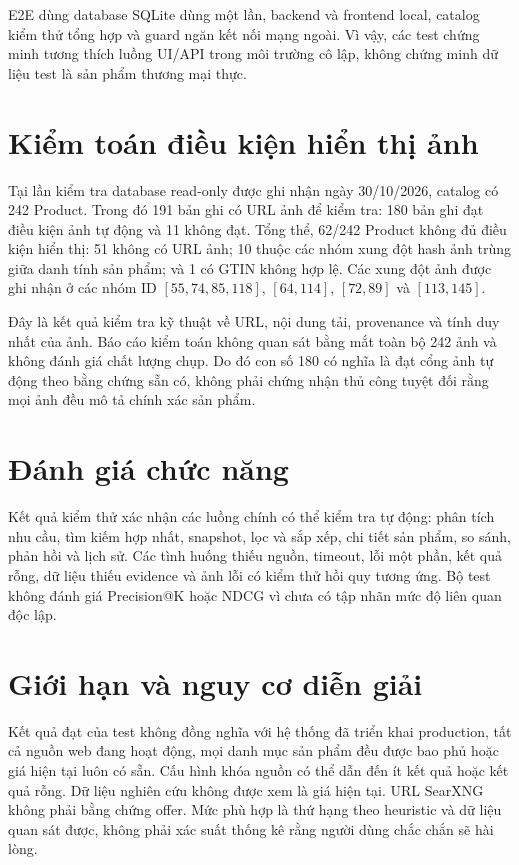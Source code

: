 E2E dùng database SQLite dùng một lần, backend và frontend local, catalog kiểm thử tổng hợp và guard ngăn kết nối mạng ngoài. Vì vậy, các test chứng minh tương thích luồng UI/API trong môi trường cô lập, không chứng minh dữ liệu test là sản phẩm thương mại thực.

\section{Kiểm toán điều kiện hiển thị ảnh}

Tại lần kiểm tra database read-only được ghi nhận ngày 30/10/2026, catalog có 242 Product. Trong đó 191 bản ghi có URL ảnh để kiểm tra: 180 bản ghi đạt điều kiện ảnh tự động và 11 không đạt. Tổng thể, 62/242 Product không đủ điều kiện hiển thị: 51 không có URL ảnh; 10 thuộc các nhóm xung đột hash ảnh trùng giữa danh tính sản phẩm; và 1 có GTIN không hợp lệ. Các xung đột ảnh được ghi nhận ở các nhóm ID $[55,74,85,118]$, $[64,114]$, $[72,89]$ và $[113,145]$.

Đây là kết quả kiểm tra kỹ thuật về URL, nội dung tải, provenance và tính duy nhất của ảnh. Báo cáo kiểm toán không quan sát bằng mắt toàn bộ 242 ảnh và không đánh giá chất lượng chụp. Do đó con số 180 có nghĩa là đạt cổng ảnh tự động theo bằng chứng sẵn có, không phải chứng nhận thủ công tuyệt đối rằng mọi ảnh đều mô tả chính xác sản phẩm.

\section{Đánh giá chức năng}

Kết quả kiểm thử xác nhận các luồng chính có thể kiểm tra tự động: phân tích nhu cầu, tìm kiếm hợp nhất, snapshot, lọc và sắp xếp, chi tiết sản phẩm, so sánh, phản hồi và lịch sử. Các tình huống thiếu nguồn, timeout, lỗi một phần, kết quả rỗng, dữ liệu thiếu evidence và ảnh lỗi có kiểm thử hồi quy tương ứng. Bộ test không đánh giá Precision@K hoặc NDCG vì chưa có tập nhãn mức độ liên quan độc lập.

\section{Giới hạn và nguy cơ diễn giải}

Kết quả đạt của test không đồng nghĩa với hệ thống đã triển khai production, tất cả nguồn web đang hoạt động, mọi danh mục sản phẩm đều được bao phủ hoặc giá hiện tại luôn có sẵn. Cấu hình khóa nguồn có thể dẫn đến ít kết quả hoặc kết quả rỗng. Dữ liệu nghiên cứu không được xem là giá hiện tại. URL SearXNG không phải bằng chứng offer. Mức phù hợp là thứ hạng theo heuristic và dữ liệu quan sát được, không phải xác suất thống kê rằng người dùng chắc chắn sẽ hài lòng.
